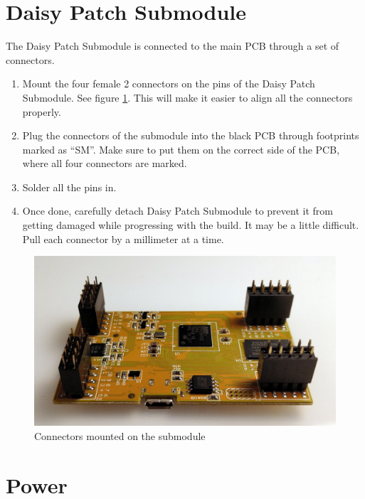 \documentclass[10pt,a4paper,twocolumn]{article}
\begin{document}

\section{Daisy Patch Submodule}

The Daisy Patch Submodule is connected to the main PCB through a set of connectors.

\begin{enumerate}
  \item Mount the four female 2 connectors on the pins of the Daisy Patch Submodule. See figure \ref{daisy}. This will make it easier to align all the connectors properly.
  \item Plug the connectors of the submodule into the black PCB through footprints marked as ``SM''. Make sure to put them on the correct side of the PCB, where all four connectors are marked.
  \item Solder all the pins in.
  \item Once done, carefully detach Daisy Patch Submodule to prevent it from getting damaged while progressing with the build. It may be a little difficult. Pull each connector by a millimeter at a time.
\end{enumerate}

\begin{figure}[p]
  \centering
  \includegraphics[width=\linewidth]{p02.jpg}
  \caption{Connectors mounted on the submodule}
  \label{daisy}
\end{figure}

\clearpage

\section{Power}
\end{document}
